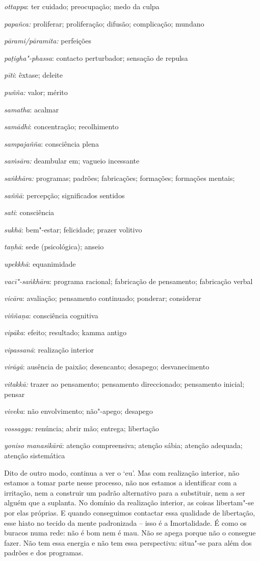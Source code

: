 {  \emph{ottappa}: ter cuidado; preocupação; medo da culpa

  \emph{papañca:} proliferar; proliferação; difusão; complicação; mundano

  \emph{pārami/pāramita:} perfeições

  \emph{paṭigha"-phassa}: contacto perturbador; sensação de repulsa

  \emph{pīti}: êxtase; deleite

  \emph{puñña:} valor; mérito

  \emph{samatha}: acalmar

  \emph{samādhi}: concentração; recolhimento

  \emph{sampajañña}: consciência plena

  \emph{saṁsāra:} deambular em; vagueio incessante

  \emph{saṅkhāra:} programas; padrões; fabricações; formações; formações mentais;

  \emph{saññā}: percepção; significados sentidos

  \emph{sati}: consciência

  \emph{sukhā}: bem"-estar; felicidade; prazer volitivo

  \emph{taṇhā}: sede (psicológica); anseio

  \emph{upekkhā}: equanimidade

  \emph{vacī"-saṅkhāra}: programa racional; fabricação de pensamento; fabricação verbal

  \emph{vicāra}: avaliação; pensamento continuado; ponderar; considerar

  \emph{viññaṇa}: consciência cognitiva

  \emph{vipāka}: efeito; resultado; kamma antigo

  \emph{vipassanā}: realização interior

  \emph{virāgā}: ausência de paixão; desencanto; desapego; desvanecimento

  \emph{vitakkā:} trazer ao pensamento; pensamento direccionado; pensamento inicial; pensar

  \emph{viveka}: não envolvimento; não"-apego; desapego

  \emph{vossagga:} renúncia; abrir mão; entrega; libertação

  \emph{yoniso manasikārā}: atenção compreensiva; atenção sábia; atenção adequada; atenção sistemática} Dito de outro modo, continua a ver o `eu'. Mas com realização interior, não estamos a tomar parte nesse processo, não nos estamos a identificar com a irritação, nem a construir um padrão alternativo para a substituir, nem a ser alguém que a suplanta. No domínio da realização interior, as coisas libertam"-se por elas próprias. E quando conseguimos contactar essa qualidade de libertação, esse hiato no tecido da mente padronizada -- isso é a Imortalidade. É como os buracos numa rede: não é bom nem é mau. Não se apega porque não o consegue fazer. Não tem essa energia e não tem essa perspectiva: situa"-se para além dos padrões e dos programas.

